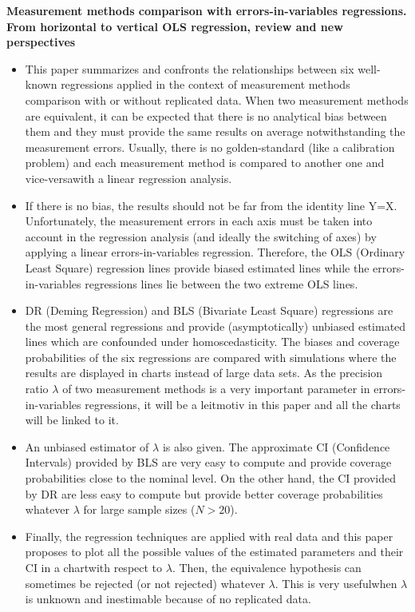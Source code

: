 \textbf{Measurement methods comparison with errors-in-variables regressions. From horizontal to vertical OLS regression, review and new perspectives}


\begin{itemize}
	\item 

This paper summarizes and confronts the relationships between six well-known regressions applied in the context of measurement methods comparison with or without replicated data. When two measurement methods are equivalent, it can be expected that there is no analytical bias between them and they must provide the same results on average notwithstanding the measurement errors. Usually, there is no golden-standard (like a calibration problem) and each measurement method is compared to another one and vice-versawith a linear regression analysis.
\item  If there is no bias, the results should not be far from the identity line Y=X. Unfortunately, the measurement errors in each axis must be taken into account in the regression analysis (and ideally the switching of axes) by applying a linear errors-in-variables regression. Therefore, the OLS (Ordinary Least Square) regression lines provide biased estimated lines while the errors-in-variables regressions lines lie between the two extreme OLS lines. 

\item DR (Deming Regression) and BLS (Bivariate Least Square) regressions are the most general regressions and provide (asymptotically) unbiased estimated lines which are confounded under homoscedasticity. The biases and coverage probabilities of the six regressions are compared with simulations where the results are displayed in charts instead of large data sets. As the precision ratio $\lambda$ of two measurement methods is a very important parameter in errors-in-variables regressions, it will be a leitmotiv in this paper and all the charts will be linked to it. 
\item An unbiased estimator of $\lambda$ is also given. The approximate CI (Confidence Intervals) provided by BLS are very easy to compute and provide coverage probabilities close to the nominal level. On the other hand, the CI provided by DR are less easy to compute but provide better coverage probabilities whatever $\lambda$ for large sample sizes ($N > 20$). 
\item Finally, the regression techniques are applied with real data and this paper proposes to plot all the possible values of the estimated parameters and their CI in a chartwith respect to $\lambda$. Then, the equivalence hypothesis can sometimes be rejected (or not rejected) whatever $\lambda$. This is very usefulwhen $\lambda$ is unknown and inestimable because of no replicated data.
\end{itemize}



